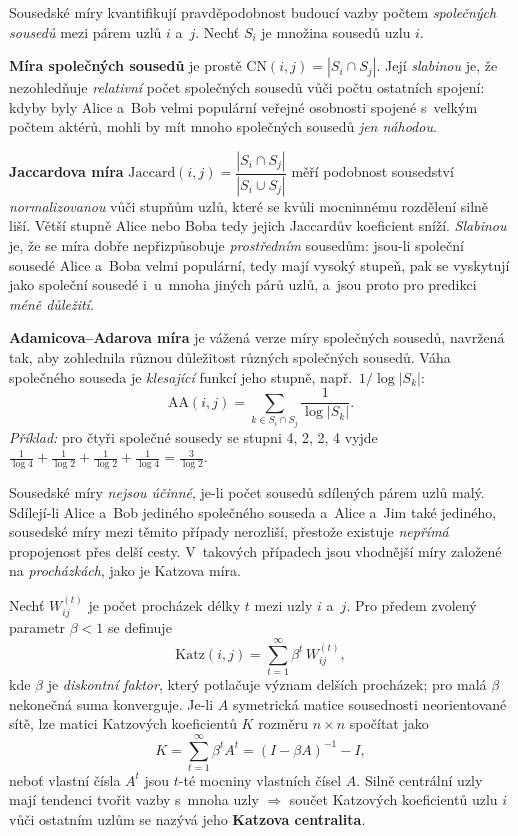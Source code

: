 \documentclass[11pt,a4paper]{article}
\theoremstyle{definition}
\begin{document}
\begin{defbox}
Sousedské míry kvantifikují pravděpodobnost budoucí vazby počtem \emph{společných sousedů} mezi
párem uzlů $i$ a~$j$. Nechť $S_i$ je množina sousedů uzlu $i$.

\textbf{Míra společných sousedů} je prostě $\mathrm{CN}(i,j)=|S_i\cap S_j|$. Její
\emph{slabinou} je, že nezohledňuje \emph{relativní} počet společných sousedů vůči počtu
ostatních spojení: kdyby byly Alice a~Bob velmi populární veřejné osobnosti spojené s~velkým
počtem aktérů, mohli by mít mnoho společných sousedů \emph{jen náhodou}.

\textbf{Jaccardova míra} $\mathrm{Jaccard}(i,j)=\dfrac{|S_i\cap S_j|}{|S_i\cup S_j|}$ měří
podobnost sousedství \emph{normalizovanou} vůči stupňům uzlů, které se kvůli mocninnému
rozdělení silně liší. Větší stupně Alice nebo Boba tedy jejich Jaccardův koeficient sníží.
\emph{Slabinou} je, že se míra dobře nepřizpůsobuje \emph{prostředním} sousedům: jsou-li
společní sousedé Alice a~Boba velmi populární, tedy mají vysoký stupeň, pak se vyskytují jako
společní sousedé i~u~mnoha jiných párů uzlů, a~jsou proto pro predikci \emph{méně důležití}.

\textbf{Adamicova--Adarova míra} je vážená verze míry společných sousedů, navržená tak, aby
zohlednila různou důležitost různých společných sousedů. Váha společného souseda je
\emph{klesající} funkcí jeho stupně, např.\ $1/\log|S_k|$:
\[ \mathrm{AA}(i,j)=\sum_{k\in S_i\cap S_j}\frac{1}{\log|S_k|}. \]
\emph{Příklad:} pro čtyři společné sousedy se stupni 4, 2, 2, 4 vyjde
$\frac{1}{\log 4}+\frac{1}{\log 2}+\frac{1}{\log 2}+\frac{1}{\log 4}=\frac{3}{\log 2}$.
\end{defbox}

\begin{defbox}
Sousedské míry \emph{nejsou účinné}, je-li počet sousedů sdílených párem uzlů malý. Sdílejí-li
Alice a~Bob jediného společného souseda a~Alice a~Jim také jediného, sousedské míry mezi těmito
případy nerozliší, přestože existuje \emph{nepřímá} propojenost přes delší cesty. V~takových
případech jsou vhodnější míry založené na \emph{procházkách}, jako je Katzova míra.

Nechť $W_{ij}^{(t)}$ je počet procházek délky $t$ mezi uzly $i$ a~$j$. Pro předem zvolený
parametr $\beta<1$ se definuje
\[ \mathrm{Katz}(i,j)=\sum_{t=1}^{\infty}\beta^{t}\,W_{ij}^{(t)}, \]
kde $\beta$ je \emph{diskontní faktor}, který potlačuje význam delších procházek; pro malá
$\beta$ nekonečná suma konverguje. Je-li $A$ symetrická matice sousednosti neorientované sítě,
lze matici Katzových koeficientů $K$ rozměru $n\times n$ spočítat jako
\[ K=\sum_{t=1}^{\infty}\beta^{t}A^{t}=(I-\beta A)^{-1}-I, \]
neboť vlastní čísla $A^t$ jsou $t$-té mocniny vlastních čísel $A$. Silně centrální uzly mají
tendenci tvořit vazby s~mnoha uzly $\Rightarrow$ součet Katzových koeficientů uzlu $i$ vůči
ostatním uzlům se nazývá jeho \textbf{Katzova centralita}.
\end{defbox}
\end{document}
